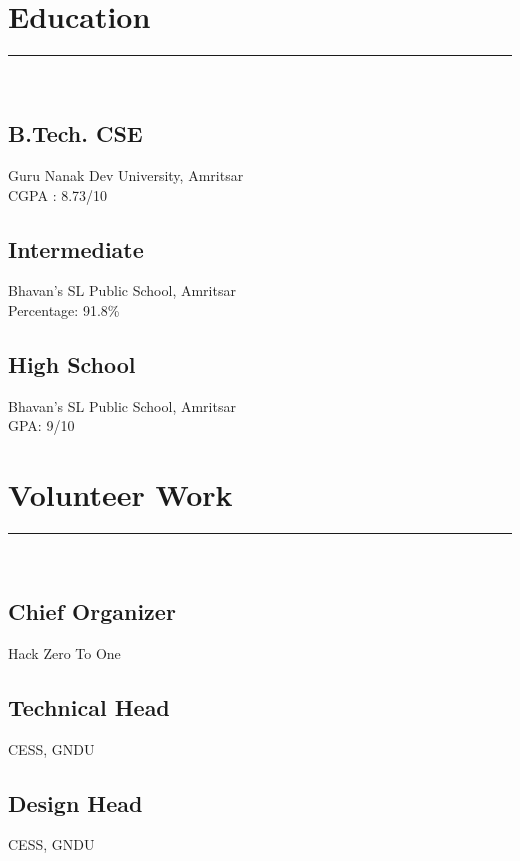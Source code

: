 \documentclass[]{puneet-resume}
\begin{document}
\begin{minipage}[t]{0.33\textwidth}
\section{Education} 
\noindent\rule{5cm}{0.4pt}\\
\subsection{B.Tech. CSE}
Guru Nanak Dev University, Amritsar\\
CGPA : 8.73/10\\
\vspace{8pt}
\subsection{Intermediate}
Bhavan's SL Public School, Amritsar\\
Percentage: 91.8\%\\
\vspace{8pt}
\subsection{High School}
Bhavan's SL Public School, Amritsar\\
GPA: 9/10
\sectionsep
\section{Volunteer Work} 
\noindent\rule{5cm}{0.4pt}\\
\subsection{Chief Organizer}
Hack Zero To One\\
\vspace{8pt}
\subsection{Technical Head}
CESS, GNDU\\
\vspace{8pt}
\subsection{Design Head}
CESS, GNDU\\
\sectionsep

\end{minipage}
\end{document}
